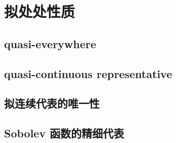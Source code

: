 \section{拟处处性质}
\label{b1:sec:2602}


\subsection{quasi-everywhere}
\label{b1:subsec:260201}

\subsection{quasi-continuous representative}
\label{b1:subsec:260202}

\subsection{拟连续代表的唯一性}
\label{b1:subsec:260203}

\subsection{Sobolev 函数的精细代表}
\label{b1:subsec:260204}


